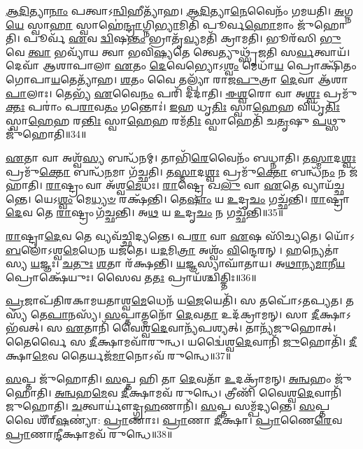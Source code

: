 \-\ul{𑌆}\-\-\ul{𑌦𑌿}\-𑌤𑍍𑌯𑌾\-\ul{𑌨𑌾𑌂} 𑌪𑌤𑍍𑌵𑌾\-𑌽\-\ul{𑌨𑍍𑌵𑌿}\-𑌹𑍀𑌤𑍍𑌯𑌾᳴𑌹।
\-\ul{𑌆}\-\-\ul{𑌦𑌿}\-𑌤𑍍𑌯𑌾\-\ul{𑌨𑍇}\-𑌵𑍈𑌨𑌂᳴ 𑌗𑌮𑌯𑌤𑌿।
\-\ul{𑌅}\-𑌗𑍍𑌨\-\ul{𑌯𑍇} 𑌸𑍍𑌵𑌾\-\ul{𑌹𑌾} 𑌸𑍍𑌵𑌾𑌹𑍇॑\-\ul{𑌨𑍍𑌦𑍍𑌰𑌾}\-𑌗𑍍𑌨𑌿\-\ul{𑌭𑍍𑌯𑌾}\-𑌮𑌿𑌤𑌿᳴ 𑌪𑍂𑌰𑍍𑌵\-\ul{𑌹𑍋}\-𑌮𑌾𑌂 𑌜𑍁᳴𑌹𑍋𑌤𑌿।
𑌪𑍂𑌰𑍍𑌵᳴ \ul{𑌏}\-𑌵 \ul{𑌦𑍍𑌵𑌿}\-𑌷\-\ul{𑌨𑍍𑌤𑌂} 𑌭𑍍𑌰𑌾𑌤𑍃᳴\-\ul{𑌵𑍍𑌯}\-𑌮𑌤𑌿᳴ 𑌕𑍍𑌰𑌾𑌮𑌤𑌿।
𑌭𑍂𑌰᳴𑌸𑌿 \ul{𑌭𑍁}\-𑌵𑍇 \ul{𑌤𑍍𑌵𑌾} 𑌭𑌵𑍍𑌯𑌾᳴𑌯 𑌤𑍍𑌵𑌾 𑌭𑌵𑌿\-\ul{𑌷𑍍𑌯}\-𑌤𑍇 𑌤𑍍𑌵𑍇𑌤𑍍𑌯𑍁𑌥𑍍𑌸𑍃᳴𑌜𑌤𑌿 𑌸\-\ul{𑌰𑍍𑌵}\-𑌤𑍍𑌵𑌾𑌯᳴।
𑌦𑍇𑌵𑌾᳴ 𑌆𑌶𑌾𑌪𑌾𑌲𑌾 \ul{𑌏}\-𑌤𑌂 \ul{𑌦𑍇}\-𑌵𑍇𑌭𑍍𑌯𑍋\-𑌽\-\ul{𑌶𑍍𑌵𑌂} 𑌮𑍇𑌧𑌾᳴\-\ul{𑌯} 𑌪𑍍𑌰𑍋𑌕𑍍𑌷𑌿᳴𑌤𑌂 𑌗𑍋𑌪𑌾\-\ul{𑌯}\-𑌤𑍇𑌤𑍍𑌯𑌾᳴𑌹।
\-\ul{𑌶}\-𑌤𑌂 𑌵𑍈 𑌤𑌲𑍍𑌪𑍍𑌯𑌾᳴ 𑌰𑌾𑌜\-\ul{𑌪𑍁}\-𑌤𑍍𑌰𑌾 \ul{𑌦𑍇}\-𑌵𑌾 𑌆᳴𑌶𑌾\-\ul{𑌪𑌾}\-𑌲𑌾𑌃।
𑌤𑍇𑌭𑍍𑌯᳴ \ul{𑌏}\-𑌵𑍈\-\ul{𑌨𑌂} 𑌪𑌰𑌿᳴ 𑌦𑌦𑌾𑌤𑌿।
\-\ul{𑌈}\-\-\ul{𑌶𑍍𑌵}\-𑌰𑍋 𑌵𑌾 𑌅\-\ul{𑌶𑍍𑌵𑌃} 𑌪𑍍𑌰𑌮𑍁᳴\-\ul{𑌕𑍍𑌤𑌃} 𑌪𑌰𑌾𑌂॑ 𑌪\-\ul{𑌰𑌾}\-𑌵\-\ul{𑌤𑌂} 𑌗𑌨𑍍𑌤𑍋𑌃॑।
\-\ul{𑌇}\-𑌹 𑌧𑍃\-\ul{𑌤𑌿𑌃} 𑌸𑍍𑌵𑌾\-\ul{𑌹𑍇}\-𑌹 𑌵𑌿𑌧𑍃᳴\-\ul{𑌤𑌿𑌃} 𑌸𑍍𑌵𑌾\-\ul{𑌹𑍇}\-𑌹 𑌰\-\ul{𑌨𑍍𑌤𑌿𑌃} 𑌸𑍍𑌵𑌾\-\ul{𑌹𑍇}\-𑌹 𑌰𑌮᳴\-\ul{𑌤𑌿𑌃} 𑌸𑍍𑌵𑌾𑌹𑍇𑌤𑌿᳴ 𑌚\-\ul{𑌤𑍃}\-𑌷𑍁 \ul{𑌪}\-𑌥𑍍𑌸𑍁 𑌜𑍁᳴𑌹𑍋𑌤𑌿॥34॥

\-\ul{𑌏}\-𑌤𑌾 𑌵𑌾 𑌅𑌶𑍍𑌵᳴\-\ul{𑌸𑍍𑌯} 𑌬𑌨𑍍𑌧᳴𑌨𑌮𑍍।
𑌤𑌾𑌭𑌿᳴\-\ul{𑌰𑍇}\-𑌵𑍈𑌨𑌂᳴ 𑌬𑌧𑍍𑌨𑌾𑌤𑌿।
𑌤\-\ul{𑌸𑍍𑌮𑌾}\-𑌦\-\ul{𑌶𑍍𑌵𑌃} 𑌪𑍍𑌰𑌮𑍁᳴\-\ul{𑌕𑍍𑌤𑍋} 𑌬𑌨𑍍𑌧᳴\-\ul{𑌨}\-𑌮𑌾 𑌗᳴𑌚𑍍𑌛𑌤𑌿।
𑌤\-\ul{𑌸𑍍𑌮𑌾}\-𑌦\-\ul{𑌶𑍍𑌵𑌃} 𑌪𑍍𑌰𑌮𑍁᳴\-\ul{𑌕𑍍𑌤𑍋} 𑌬𑌨𑍍𑌧᳴\-\ul{𑌨𑌂} 𑌨 𑌜᳴𑌹𑌾𑌤𑌿।
\-\ul{𑌰𑌾}\-𑌷𑍍𑌟𑍍𑌰𑌂 𑌵𑌾 𑌅᳴𑌶𑍍𑌵\-\ul{𑌮𑍇}\-𑌧𑌃।
\-\ul{𑌰𑌾}\-𑌷𑍍𑌟𑍍𑌰𑍇 𑌖\-\ul{𑌲𑍁} 𑌵𑌾 \ul{𑌏}\-𑌤𑍇 𑌵𑍍𑌯𑌾𑌯᳴𑌚𑍍𑌛𑌨𑍍𑌤𑍇।
𑌯𑍇𑌽\-\ul{𑌶𑍍𑌵𑌂} 𑌮𑍇\-\ul{𑌧𑍍𑌯}\-\-\ul{𑍞} 𑌰𑌕𑍍𑌷᳴𑌨𑍍𑌤𑌿।
𑌤𑍇\-\ul{𑌷𑌾𑌂} 𑌯 \ul{𑌉}\-𑌦𑍃\-\ul{𑌚𑌂} 𑌗𑌚𑍍𑌛᳴𑌨𑍍𑌤𑌿।
\-\ul{𑌰𑌾}\-𑌷𑍍𑌟𑍍𑌰𑌾\-\ul{𑌦𑍇}\-𑌵 𑌤𑍇 \ul{𑌰𑌾}\-𑌷𑍍𑌟𑍍𑌰𑌂 𑌗᳴𑌚𑍍𑌛𑌨𑍍𑌤𑌿।
𑌅\-\ul{𑌥} 𑌯 \ul{𑌉}\-𑌦𑍃\-\ul{𑌚𑌂} 𑌨 𑌗𑌚𑍍𑌛᳴𑌨𑍍𑌤𑌿॥35॥

\-\ul{𑌰𑌾}\-𑌷𑍍𑌟𑍍𑌰𑌾\-\ul{𑌦𑍇}\-𑌵 𑌤𑍇 𑌵𑍍𑌯𑌵᳴𑌚𑍍𑌛𑌿𑌦𑍍𑌯𑌨𑍍𑌤𑍇।
𑌪\-\ul{𑌰𑌾} 𑌵𑌾 \ul{𑌏}\-𑌷 𑌸𑌿᳴𑌚𑍍𑌯𑌤𑍇।
𑌯𑍋᳴𑌽\-\ul{𑌬}\-𑌲𑍋॑\-𑌽𑌶𑍍𑌵\-\ul{𑌮𑍇}\-𑌧𑍇\-\ul{𑌨} 𑌯𑌜᳴𑌤𑍇।
𑌯\-\ul{𑌦}\-𑌮𑌿\-\ul{𑌤𑍍𑌰𑌾} 𑌅𑌶𑍍𑌵𑌂᳴ \ul{𑌵𑌿}\-𑌨𑍍𑌦𑍇𑌰𑌨𑍍।
\-\ul{𑌹}\-𑌨𑍍𑌯𑍇𑌤𑌾॑𑌸𑍍𑌯 \ul{𑌯}\-𑌜𑍍𑌞𑌃।
\-\ul{𑌚}\-\-\ul{𑌤𑍁𑌃} \ul{𑌶}\-𑌤𑌾 𑌰᳴𑌕𑍍𑌷𑌨𑍍𑌤𑌿।
\-\ul{𑌯}\-𑌜𑍍𑌞𑌸𑍍𑌯𑌾𑌘𑌾᳴𑌤𑌾𑌯।
𑌅\-\ul{𑌥𑌾}\-𑌨𑍍𑌯\-\ul{𑌮𑌾}\-𑌨𑍀\-\ul{𑌯} 𑌪𑍍𑌰𑍋𑌕𑍍𑌷𑍇᳴𑌯𑍁𑌃।
𑌸𑍈𑌵 𑌤\-\ul{𑌤𑌃} 𑌪𑍍𑌰𑌾𑌯᳴𑌶𑍍𑌚𑌿𑌤𑍍𑌤𑌿𑌃॥36॥\anuvakamend[\-\ul{𑌗}\-\-\ul{𑌚𑍍𑌛}\-\-\ul{𑌤𑌿} \ul{𑌭}\-\-\ul{𑌵}\-\-\ul{𑌤𑌃} \ul{𑌪}\-𑌥𑍍𑌸𑍁 𑌜𑍁᳴𑌹𑍋\-\ul{𑌤𑌿} 𑌨 𑌗𑌚𑍍𑌛᳴\-\ul{𑌨𑍍𑌤𑌿} 𑌨𑌵᳴ 𑌚]

\-\ul{𑌪𑍍𑌰}\-𑌜𑌾𑌪᳴𑌤𑌿𑌰𑌕𑌾𑌮𑌯𑌤𑌾𑌶𑍍𑌵\-\ul{𑌮𑍇}\-𑌧𑍇𑌨᳴ 𑌯\-\ul{𑌜𑍇}\-𑌯𑍇𑌤𑌿᳴।
𑌸 𑌤𑌪𑍋᳴\-𑌽𑌤𑌪𑍍𑌯𑌤।
𑌤𑌸𑍍𑌯᳴ 𑌤𑍇\-\ul{𑌪𑌾}\-𑌨𑌸𑍍𑌯᳴।
\-\ul{𑌸}\-𑌪𑍍𑌤𑌾𑌤𑍍𑌮𑌨𑍋᳴ \ul{𑌦𑍇}\-𑌵\-\ul{𑌤𑌾} 𑌉𑌦᳴𑌕𑍍𑌰𑌾𑌮𑌨𑍍।
𑌸𑌾 \ul{𑌦𑍀}\-𑌕𑍍𑌷𑌾\-𑌽𑌭᳴𑌵𑌤𑍍।
𑌸 \ul{𑌏}\-𑌤𑌾𑌨𑌿᳴ 𑌵𑍈𑌶𑍍𑌵\-\ul{𑌦𑍇}\-𑌵𑌾𑌨𑍍𑌯᳴𑌪𑌶𑍍𑌯𑌤𑍍।
𑌤𑌾𑌨𑍍𑌯᳴𑌜𑍁𑌹𑍋𑌤𑍍।
𑌤𑍈𑌰𑍍𑌵𑍈 𑌸 \ul{𑌦𑍀}\-𑌕𑍍𑌷𑌾𑌮𑌵𑌾᳴𑌰𑍁𑌨𑍍𑌧।
𑌯𑌦𑍍𑌵𑍈॑𑌶𑍍𑌵\-\ul{𑌦𑍇}\-𑌵𑌾𑌨𑌿᳴ \ul{𑌜𑍁}\-𑌹𑍋𑌤𑌿᳴।
\-\ul{𑌦𑍀}\-𑌕𑍍𑌷𑌾\-\ul{𑌮𑍇}\-𑌵 𑌤𑍈𑌰𑍍𑌯𑌜᳴\-\ul{𑌮𑌾}\-𑌨𑍋𑌽𑌵᳴ 𑌰𑍁𑌨𑍍𑌧𑍇॥37॥

\-\ul{𑌸}\-𑌪𑍍𑌤 𑌜𑍁᳴𑌹𑍋𑌤𑌿।
\-\ul{𑌸}\-𑌪𑍍𑌤 𑌹𑌿 𑌤𑌾 \ul{𑌦𑍇}\-𑌵𑌤𑌾᳴ \ul{𑌉}\-𑌦𑌕𑍍𑌰𑌾᳴𑌮𑌨𑍍।
\-\ul{𑌅}\-\-\ul{𑌨𑍍𑌵}\-𑌹𑌂 𑌜𑍁᳴𑌹𑍋𑌤𑌿।
\-\ul{𑌅}\-\-\ul{𑌨𑍍𑌵}\-𑌹\-\ul{𑌮𑍇}\-𑌵 \ul{𑌦𑍀}\-𑌕𑍍𑌷𑌾𑌮𑌵᳴ 𑌰𑍁𑌨𑍍𑌧𑍇।
𑌤𑍍𑌰𑍀𑌣𑌿᳴ 𑌵𑍈𑌶𑍍𑌵\-\ul{𑌦𑍇}\-𑌵𑌾𑌨𑌿᳴ 𑌜𑍁𑌹𑍋𑌤𑌿।
\-\ul{𑌚}\-𑌤𑍍𑌵𑌾𑌰𑍍𑌯𑍗॑𑌦𑍍𑌗𑍍𑌰\-\ul{𑌹}\-𑌣𑌾𑌨𑌿᳴।
\-\ul{𑌸}\-𑌪𑍍𑌤 𑌸𑌮𑍍𑌪᳴𑌦𑍍𑌯𑌨𑍍𑌤𑍇।
\-\ul{𑌸}\-𑌪𑍍𑌤 𑌵𑍈 𑌶𑍀᳴𑌰𑍍‌\mbox{}\-\ul{𑌷}\-𑌣𑍍𑌯𑌾॑: \ul{𑌪𑍍𑌰𑌾}\-𑌣𑌾𑌃।
\-\ul{𑌪𑍍𑌰𑌾}\-𑌣𑌾 \ul{𑌦𑍀}\-𑌕𑍍𑌷𑌾।
\-\ul{𑌪𑍍𑌰𑌾}\-𑌣𑍈\-\ul{𑌰𑍇}\-𑌵 \ul{𑌪𑍍𑌰𑌾}\-𑌣𑌾\-\ul{𑌨𑍍𑌦𑍀}\-𑌕𑍍𑌷𑌾𑌮𑌵᳴ 𑌰𑍁𑌨𑍍𑌧𑍇॥38॥

